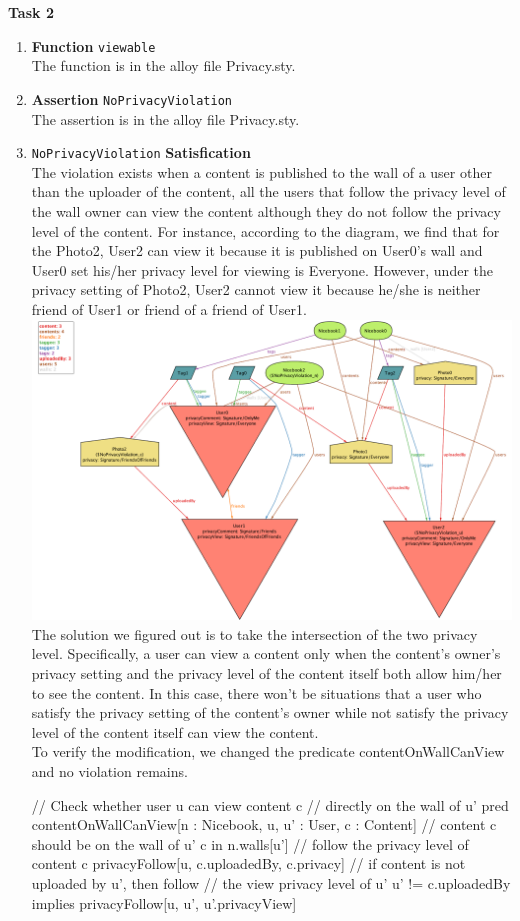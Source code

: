 \documentclass[titlepage]{article}
\begin{document}
{\bf\Large Task 2}
\begin{enumerate}[\bf\large 1.]
    \item {\bf\large Function} \texttt{\large viewable}\\[1ex]
    The function is in the alloy file Privacy.sty.
    \item {\bf\large Assertion} \texttt{\large NoPrivacyViolation}\\[1ex]
    The assertion is in the alloy file Privacy.sty.
    \item \texttt{\large NoPrivacyViolation} {\bf\large Satisfication}\\[1ex]
    The violation exists when a content is published to the wall of a user other than the uploader of the content, all the users that follow the privacy level of the wall owner can view the content although they do not follow the privacy level of the content. For instance, according to the diagram, we find that for the Photo2, User2 can view it because it is published on User0’s wall and User0 set his/her privacy level for viewing is Everyone. However, under the privacy setting of Photo2, User2 cannot view it because he/she is neither friend of User1 or friend of a friend of User1.\\[1ex]
    \includegraphics[width=6in]{counterexample.png}\\[1ex]
    The solution we figured out is to take the intersection of the two privacy level. Specifically, a user can view a content only when the content’s owner’s privacy setting and the privacy level of the content itself both allow him/her to see the content. In this case, there won’t be situations that a user who satisfy the privacy setting of the content’s owner while not satisfy the privacy level of the content itself can view the content.\\
    To verify the modification, we changed the predicate contentOnWallCanView and no violation remains.
    \begin{alloy}
// Check whether user u can view content c
// directly on the wall of u'
pred contentOnWallCanView[n : Nicebook, u, u' : User, c : Content] {
    // content c should be on the wall of u'
    c in n.walls[u']
    // follow the privacy level of content c
    privacyFollow[u, c.uploadedBy, c.privacy]
    // if content is not uploaded by u', then follow
    // the view privacy level of u'
    u' != c.uploadedBy implies privacyFollow[u, u', u'.privacyView]
}
    \end{alloy}
\end{enumerate}
\end{document}
